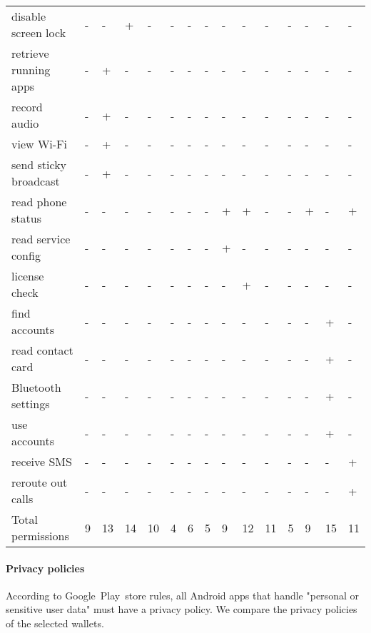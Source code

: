 \begin{table*}
\begin{tabular}{ | l | l l l l l l l | l l l l l l l |}
		disable screen lock & - & - & + & - & - & - & - & - & - & - & - & - & - & - \\
		retrieve running apps & - & + & - & - & - & - & - & - & - & - & - & - & - & - \\
		record audio & - & + & - & - & - & - & - & - & - & - & - & - & - & - \\
		view Wi-Fi & - & + & - & - & - & - & - & - & - & - & - & - & - & - \\
		send sticky broadcast & - & + & - & - & - & - & - & - & - & - & - & - & - & - \\
		read phone status & - & - & - & - & - & - & - & + & + & - & - & + & - & + \\
		read service config & - & - & - & - & - & - & - & + & - & - & - & - & - & - \\
		license check & - & - & - & - & - & - & - & - & + & - & - & - & - & - \\
		find accounts & - & - & - & - & - & - & - & - & - & - & - & - & + & - \\
		read contact card & - & - & - & - & - & - & - & - & - & - & - & - & + & - \\
		Bluetooth settings & - & - & - & - & - & - & - & - & - & - & - & - & + & - \\
		use accounts & - & - & - & - & - & - & - & - & - & - & - & - & + & - \\
		receive SMS & - & - & - & - & - & - & - & - & - & - & - & - & - & + \\
		reroute out calls & - & - & - & - & - & - & - & - & - & - & - & - & - & + \\
		\hline
		Total permissions & 9 & 13 & 14 & 10 & 4 & 6 & 5 & 9 & 12 & 11 & 5 & 9 & 15 & 11 \\
		\hline
	\end{tabular}
	\label{tab:permissions}
\end{table*}


\paragraph{Privacy policies}
According to Google~Play~store rules, all Android apps that handle "personal or sensitive user data" must have a privacy policy.
We compare the privacy policies of the selected wallets.

